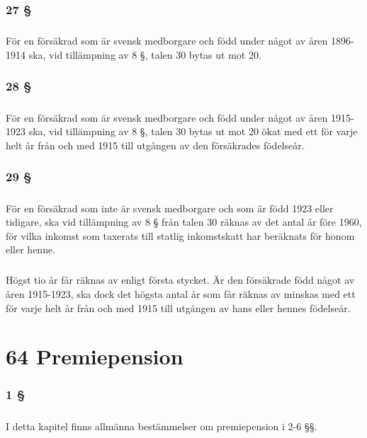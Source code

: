 \documentclass[a4paper,notitlepage,openany,10pt]{book}
\begin{document}
\subsection*{27 §}
\paragraph*{}
För en försäkrad som är svensk medborgare och född under något av åren 1896-1914 ska, vid tillämpning av 8 §, talen 30 bytas ut mot 20.
\subsection*{28 §}
\paragraph*{}
För en försäkrad som är svensk medborgare och född under något av åren 1915-1923 ska, vid tillämpning av 8 §, talen 30 bytas ut mot 20 ökat med ett för varje helt år från och med 1915 till utgången av den försäkrades födelseår.
\subsection*{29 §}
\paragraph*{}
För en försäkrad som inte är svensk medborgare och som är född 1923 eller tidigare, ska vid tillämpning av 8 § från talen 30 räknas av det antal år före 1960, för vilka inkomst som taxerats till statlig inkomstskatt har beräknats för honom eller henne.
\paragraph*{}
Högst tio år får räknas av enligt första stycket. Är den försäkrade född något av åren 1915-1923, ska dock det högsta antal år som får räknas av minskas med ett för varje helt år från och med 1915 till utgången av hans eller hennes födelseår.
\chapter*{64 Premiepension}
\subsection*{1 §}
\paragraph*{}
I detta kapitel finns allmänna bestämmelser om premiepension i 2-6 §§.
\end{document}
